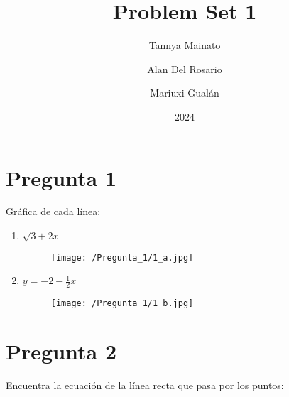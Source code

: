 \documentclass[]{article}
\title{Problem Set 1}
\author{Tannya Mainato \and Alan Del Rosario \and Mariuxi Gualán}
\date{2024}
\begin{document}
\maketitle
\section*{Pregunta 1}

Gráfica de cada línea:

\begin{enumerate}[label=\alph*)]
	\item $\sqrt{3+2x}$ 
	\begin{figure}[H]
		\texttt{[image: /Pregunta\_1/1\_a.jpg]}
	\end{figure}
	\item $y=-2-\frac{1}{2}x$
	\begin{figure}[H]
		\texttt{[image: /Pregunta\_1/1\_b.jpg]}
	\end{figure}
\end{enumerate}

\section*{Pregunta 2}
Encuentra la ecuación de la línea recta que pasa por los puntos:
\end{document}
